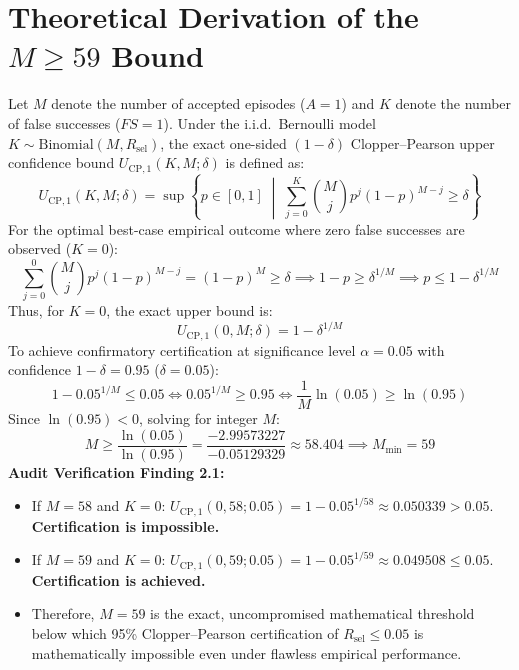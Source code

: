 \documentclass[10pt,a4paper]{article}
\begin{document}
\section{Theoretical Derivation of the $M \ge 59$ Bound}
Let $M$ denote the number of accepted episodes ($A=1$) and $K$ denote the number of false successes ($FS=1$). Under the i.i.d.\ Bernoulli model $K \sim \mathrm{Binomial}(M, R_{\mathrm{sel}})$, the exact one-sided $(1 - \delta)$ Clopper--Pearson upper confidence bound $U_{\mathrm{CP}, 1}(K, M; \delta)$ is defined as:
\begin{equation}
U_{\mathrm{CP}, 1}(K, M; \delta) = \sup \left\{ p \in [0, 1] \;\middle|\; \sum_{j=0}^{K} \binom{M}{j} p^j (1 - p)^{M-j} \ge \delta \right\}
\end{equation}
For the optimal best-case empirical outcome where zero false successes are observed ($K = 0$):
\begin{equation}
\sum_{j=0}^{0} \binom{M}{j} p^j (1 - p)^{M-j} = (1 - p)^M \ge \delta \implies 1 - p \ge \delta^{1/M} \implies p \le 1 - \delta^{1/M}
\end{equation}
Thus, for $K = 0$, the exact upper bound is:
\begin{equation}
U_{\mathrm{CP}, 1}(0, M; \delta) = 1 - \delta^{1/M}
\end{equation}
To achieve confirmatory certification at significance level $\alpha = 0.05$ with confidence $1 - \delta = 0.95$ ($\delta = 0.05$):
\begin{equation}
1 - 0.05^{1/M} \le 0.05 \iff 0.05^{1/M} \ge 0.95 \iff \frac{1}{M} \ln(0.05) \ge \ln(0.95)
\end{equation}
Since $\ln(0.95) < 0$, solving for integer $M$:
\begin{equation}
M \ge \frac{\ln(0.05)}{\ln(0.95)} = \frac{-2.99573227}{-0.05129329} \approx 58.404 \implies M_{\min} = 59
\end{equation}
\textbf{Audit Verification Finding 2.1:}
\begin{itemize}
    \item If $M = 58$ and $K = 0$: $U_{\mathrm{CP}, 1}(0, 58; 0.05) = 1 - 0.05^{1/58} \approx 0.050339 > 0.05$. \textbf{Certification is impossible.}
    \item If $M = 59$ and $K = 0$: $U_{\mathrm{CP}, 1}(0, 59; 0.05) = 1 - 0.05^{1/59} \approx 0.049508 \le 0.05$. \textbf{Certification is achieved.}
    \item Therefore, $M = 59$ is the exact, uncompromised mathematical threshold below which 95\% Clopper--Pearson certification of $R_{\mathrm{sel}} \le 0.05$ is mathematically impossible even under flawless empirical performance.
\end{itemize}
\end{document}
